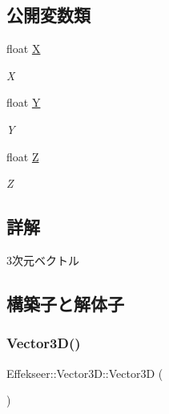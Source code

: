 \subsection*{公開変数類}
\begin{DoxyCompactItemize}
\item 
float \mbox{\hyperlink{struct_effekseer_1_1_vector3_d_a72ca019b959303fd6b5a685634a5ab24}{X}}
\begin{DoxyCompactList}\small\item\em X \end{DoxyCompactList}\item 
float \mbox{\hyperlink{struct_effekseer_1_1_vector3_d_a93a6252ad3d33b83eac5f088ed51c114}{Y}}
\begin{DoxyCompactList}\small\item\em Y \end{DoxyCompactList}\item 
float \mbox{\hyperlink{struct_effekseer_1_1_vector3_d_aa73821e922d235f82cfb3d8eab43901a}{Z}}
\begin{DoxyCompactList}\small\item\em Z \end{DoxyCompactList}\end{DoxyCompactItemize}


\subsection{詳解}
3次元ベクトル 

\subsection{構築子と解体子}
\mbox{\label{struct_effekseer_1_1_vector3_d_abf224ea54e943e49876d5d5843693661}} 
\subsubsection{\texorpdfstring{Vector3\+D()}{Vector3D()}\hspace{0.1cm}{\footnotesize\ttfamily [1/2]}}
{\footnotesize\ttfamily Effekseer\+::\+Vector3\+D\+::\+Vector3D (\begin{DoxyParamCaption}{ }\end{DoxyParamCaption})}



